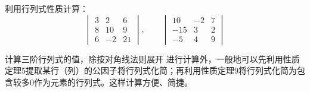 \begin{example}
    利用行列式性质计算：
\[\begin{vmatrix}
    3&2&6\\
    8&10&9\\
    6&-2&21
\end{vmatrix},\qquad \begin{vmatrix}
    10&-2&7\\
    -15&3&2\\
    -5&4&9 
\end{vmatrix}\]
\end{example}

\begin{analyze}
    计算三阶行列式的值，除按对角线法则展开
    进行计算外，一般地可以先利用性质定理5提取某行（列）的公因子将行列式化简；再利用性质定理9将行列式化简为包含较多0作为元素的行列式。这样计算方便、简捷。  
\end{analyze}

